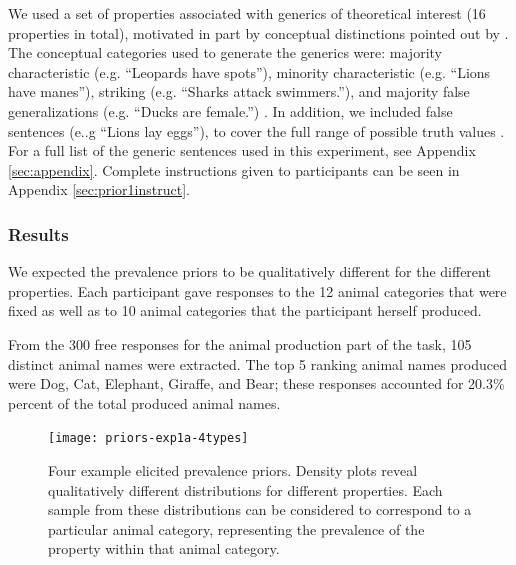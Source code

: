 \documentclass[10pt,letterpaper]{article}
\begin{document}
We used a set of properties associated with generics of theoretical interest (16 properties in total), motivated in part by conceptual distinctions pointed out by . 
The conceptual categories used to generate the generics were: majority characteristic (e.g. ``Leopards have spots''), minority characteristic (e.g. ``Lions have manes''), striking (e.g. ``Sharks attack swimmers.''), and majority false generalizations (e.g. ``Ducks are female.'') \cite{Prasada2013}. In addition, we included false sentences (e..g ``Lions lay eggs''), to cover the full range of possible truth values .
For a full list of the generic sentences used in this experiment, see Appendix \ref{sec:appendix}.
Complete instructions given to participants can be seen in Appendix \ref{sec:prior1instruct}.





\subsubsection{Results}

We expected the prevalence priors to be qualitatively different for the different properties. Each participant gave responses to the 12 animal categories that were fixed as well as to 10 animal categories that the participant herself produced. 

From the 300 free responses for the animal production part of the task, 105 distinct animal names were extracted. The top 5 ranking animal names produced were Dog, Cat, Elephant, Giraffe, and Bear; these responses accounted for 20.3\% percent of the total produced animal names.

\begin{figure}
\centering
    \texttt{[image: priors-exp1a-4types]}
    \caption{Four example elicited prevalence priors. Density plots reveal qualitatively different distributions for different properties. Each sample from these distributions can be considered to correspond to a particular animal category, representing the prevalence of the property within that animal category.}
  \label{fig:priors1a}
\end{figure}
\end{document}
